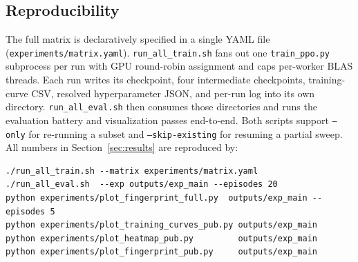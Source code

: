 \subsection{Reproducibility}
\label{sec:repro}

The full matrix is declaratively specified in a single YAML file
(\texttt{experiments/matrix.yaml}). \texttt{run\_all\_train.sh} fans out one
\texttt{train\_ppo.py} subprocess per run with GPU round-robin assignment and
caps per-worker BLAS threads. Each run writes its checkpoint, four
intermediate checkpoints, training-curve CSV, resolved hyperparameter JSON,
and per-run log into its own directory. \texttt{run\_all\_eval.sh} then
consumes those directories and runs the evaluation battery and visualization
passes end-to-end. Both scripts support \texttt{--only} for re-running a
subset and \texttt{--skip-existing} for resuming a partial sweep. All numbers
in Section~\ref{sec:results} are reproduced by:

\begin{verbatim}
./run_all_train.sh --matrix experiments/matrix.yaml
./run_all_eval.sh  --exp outputs/exp_main --episodes 20
python experiments/plot_fingerprint_full.py  outputs/exp_main --episodes 5
python experiments/plot_training_curves_pub.py outputs/exp_main
python experiments/plot_heatmap_pub.py         outputs/exp_main
python experiments/plot_fingerprint_pub.py     outputs/exp_main
\end{verbatim}
